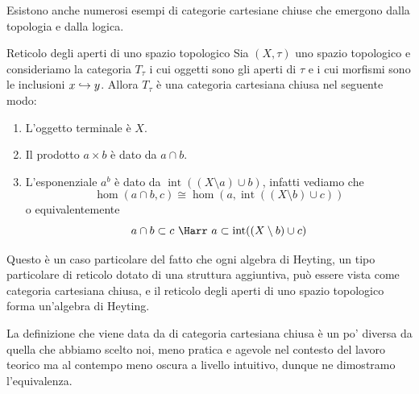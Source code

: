 \documentclass[openany]{book}
\begin{document}
Esistono anche numerosi esempi di categorie cartesiane chiuse che emergono dalla topologia e dalla logica.

\renewcommand\int{\operatorname{int}}
\begin{example}{Reticolo degli aperti di uno spazio topologico}{}
    Sia $(X,\tau)$ uno spazio topologico e consideriamo la categoria $T_\tau$ i cui oggetti sono gli aperti di $\tau$ e i cui morfismi sono le inclusioni $x\hookrightarrow y$. Allora $T_\tau$ è una categoria cartesiana chiusa nel seguente modo:
    \begin{enumerate}
        \item L'oggetto terminale è $X$.
        \item Il prodotto $a\times b$ è dato da $a\cap b$.
        \item L'esponenziale $a^b$ è dato da $\int((X\setminus a)\cup b)$, infatti vediamo che 
        \[ \hom(a\cap b, c) \cong \hom(a, \int((X\setminus b)\cup c) ) \]
        o equivalentemente 
        \[ a\cap b\subset c\ \Harr\ a\subset \int((X\setminus b)\cup c) \]
    \end{enumerate}
    Questo è un caso particolare del fatto che ogni algebra di Heyting, un tipo particolare di reticolo dotato di una struttura aggiuntiva, può essere vista come categoria cartesiana chiusa, e il reticolo degli aperti di uno spazio topologico forma un'algebra di Heyting.
\end{example}

La definizione che viene data da \cite{MacLane1969} di categoria cartesiana chiusa è un po' diversa da quella che abbiamo scelto noi, meno pratica e agevole nel contesto del lavoro teorico ma al contempo meno oscura a livello intuitivo, dunque ne dimostramo l'equivalenza.
\end{document}
